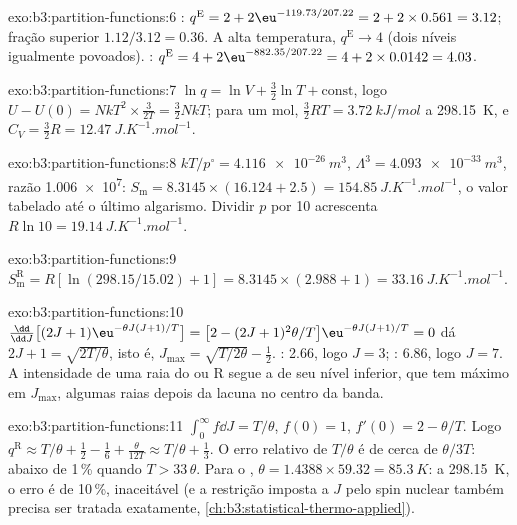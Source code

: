 \begin{solution}{exo:b3:partition-functions:6}
: $q^{\mathrm E} = 2 + 2\eu^{-119.73/207.22} = 2 + 2 \times 0.561 = 3.12$; fração superior $1.12/3.12
= 0.36$. A alta temperatura, $q^{\mathrm E} \to 4$ (dois níveis igualmente povoados). :
$q^{\mathrm E} = 4 + 2\eu^{-882.35/207.22} = 4 + 2 \times 0.0142 = 4.03$.
\end{solution}

\begin{solution}{exo:b3:partition-functions:7}
$\ln q = \ln V + \frac32\ln T + \text{const}$, logo $U - U(0) = NkT^2 \times \frac{3}{2T} = \frac32NkT$; para um
mol, $\frac32RT = \qty{3.72}{kJ/mol}$ a \qty{298.15}{K}, e $C_V = \frac32R = \qty{12.47}{J.K^{-1}.mol^{-1}}$.
\end{solution}

\begin{solution}{exo:b3:partition-functions:8}
$kT/p^\circ = \qty{4.116e-26}{m^3}$, $\Lambda^3 = \qty{4.093e-33}{m^3}$, razão \num{1.006e7}:
$S_{\mathrm m} = 8.3145 \times (16.124 + 2.5) = \qty{154.85}{J.K^{-1}.mol^{-1}}$, o valor tabelado até o
último algarismo. Dividir $p$ por 10 acrescenta $R\ln10 = \qty{19.14}{J.K^{-1}.mol^{-1}}$.
\end{solution}

\begin{solution}{exo:b3:partition-functions:9}
$S^{\mathrm R}_{\mathrm m} = R[\ln(298.15/15.02) + 1] = 8.3145 \times (2.988 + 1) = \qty{33.16}{J.K^{-1}.mol^{-1}}$.
\end{solution}

\begin{solution}{exo:b3:partition-functions:10}
$\frac{\dd}{\dd J}\bigl[(2J+1)\eu^{-\theta J(J+1)/T}\bigr] = \bigl[2 - (2J+1)^2\theta/T\bigr]\eu^{-\theta J(J+1)/T} = 0$ dá
$2J + 1 = \sqrt{2T/\theta}$, isto é, $J_{\max} = \sqrt{T/2\theta} - \frac12$. : 2.66, logo $J = 3$; :
6.86, logo $J = 7$. A intensidade de uma raia do  ou R segue a 
de seu nível inferior, que tem máximo em $J_{\max}$, algumas raias depois da lacuna
no centro da banda.
\end{solution}

\begin{solution}{exo:b3:partition-functions:11}
$\int_0^\infty f\dd J = T/\theta$, $f(0) = 1$, $f'(0) = 2 - \theta/T$. Logo $q^{\mathrm R} \approx T/\theta + \frac12 -
\frac16 + \frac{\theta}{12T} \approx T/\theta + \frac13$. O erro relativo de $T/\theta$ é de cerca de $\theta/3T$:
abaixo de 1\,\% quando $T > 33\,\theta$. Para o , $\theta = 1.4388 \times 59.32 = \qty{85.3}{K}$: a
\qty{298.15}{K}, o erro é de 10\,\%, inaceitável (e a restrição imposta a $J$ pelo spin
nuclear também precisa ser tratada exatamente, \cref{ch:b3:statistical-thermo-applied}).
\end{solution}


